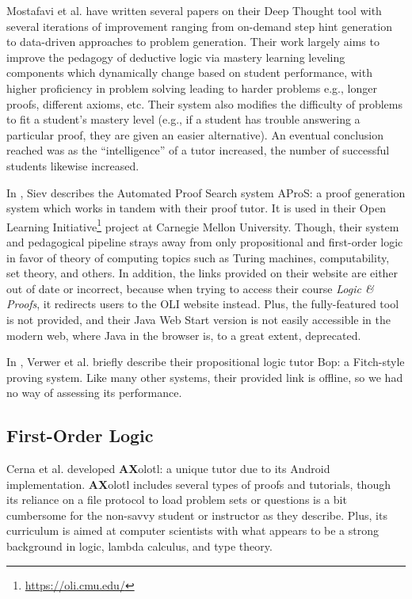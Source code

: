 \documentclass[ms]{uncgdissertationexp2}
\theoremstyle{plain}
\theoremstyle{definition}
\theoremstyle{remark}
\begin{document}
Mostafavi et al. \cite{mostafavi} have written several papers on their Deep Thought tool with several iterations of improvement ranging from on-demand step hint generation to data-driven approaches to problem generation. Their work largely aims to improve the pedagogy of deductive logic via mastery learning leveling components which dynamically change based on student performance, with higher proficiency in problem solving leading to harder problems e.g., longer proofs, different axioms, etc. Their system also modifies the difficulty of problems to fit a student's mastery level (e.g., if a student has trouble answering a particular proof, they are given an easier alternative). An eventual conclusion reached was as the ``intelligence'' of a tutor increased, the number of successful students likewise increased. 

In \cite{apros}, Siev describes the Automated Proof Search system AProS: a proof generation system which works in tandem with their proof tutor. It is used in their Open Learning Initiative\footnote{\url{https://oli.cmu.edu/}} project at Carnegie Mellon University. Though, their system and pedagogical pipeline strays away from only propositional and first-order logic in favor of theory of computing topics such as Turing machines, computability, set theory, and others. In addition, the links provided on their website are either out of date or incorrect, because when trying to access their course \textit{Logic \& Proofs}, it redirects users to the OLI website instead. Plus, the fully-featured tool is not provided, and their Java Web Start version is not easily accessible in the modern web, where Java in the browser is, to a great extent, deprecated.

In \cite{verwer}, Verwer et al. briefly describe their propositional logic tutor Bop: a Fitch-style proving system. Like many other systems, their provided link is offline, so we had no way of assessing its performance.

\subsection{First-Order Logic}
Cerna et al. \cite{cerna} developed \textbf{AX}olotl: a unique tutor due to its Android implementation. \textbf{AX}olotl includes several types of proofs and tutorials, though its reliance on a file protocol to load problem sets or questions is a bit cumbersome for the non-savvy student or instructor as they describe. Plus, its curriculum is aimed at computer scientists with what appears to be a strong background in logic, lambda calculus, and type theory.
\end{document}
